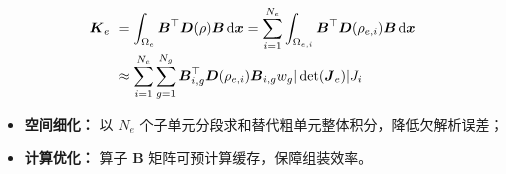\documentclass[notheorems]{beamer}
\begin{document}
\begin{frame}[t]
{\begin{tcolorbox}
				{\small
					\begin{equation*}
						\addtolength{\jot}{-2pt}
						\begin{aligned}
							\boldsymbol{K}_e 
							&= \int_{\Omega_e} \boldsymbol{B}^\top \boldsymbol{D}(\rho) \boldsymbol{B} \,\mathrm{d}\boldsymbol{x} = \sum_{i=1}^{N_e} \int_{\Omega_{e,i}} \boldsymbol{B}^\top \boldsymbol{D}(\rho_{e,i}) \boldsymbol{B} \,\mathrm{d}\boldsymbol{x} \\ 
							&\approx {\sum_{i=1}^{N_e}} \sum_{g=1}^{N_g} \boldsymbol{B}_{i,g}^\top \boldsymbol{D}(\rho_{e,i}) \boldsymbol{B}_{i,g} w_g {|\det(\boldsymbol{J}_e)| J_i}
						\end{aligned}
					\end{equation*}
				}
				
				{\fontsize{9}{12}\selectfont\sffamily
					\begin{itemize}
						\item \textbf{空间细化：} 以 $N_e$ 个子单元分段求和替代粗单元整体积分，降低欠解析误差；
						\item \textbf{计算优化：} 算子 $\boldsymbol{B}$ 矩阵可预计算缓存，保障组装效率。
				\end{itemize}}
			\end{tcolorbox}
		}
		
	\end{frame}
	
	
\end{document}
